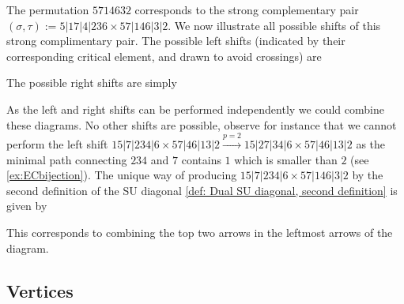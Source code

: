 \begin{example} \label{ex:shifts}
The permutation $5714632$ corresponds to the strong complementary pair $(\sigma,\tau) := 5|17|4|236 \times 57|146|3|2$. We now illustrate all possible shifts of this strong complimentary pair. The possible left shifts (indicated by their corresponding critical element, and drawn to avoid crossings) are
\begin{center}
\end{center}
The possible right shifts are simply
\begin{center}
\end{center}
As the left and right shifts can be performed independently we could combine these diagrams.
No other shifts are possible, observe for instance that we cannot perform the left shift $15|7|234|6 \times 57|46|13|2 \xrightarrow{p=2} 15|27|34|6 \times 57|46|13|2$ as the minimal path connecting $234$ and $7$ contains $1$ which is smaller than $2$ (see \cref{ex:ECbijection}). The unique way of producing $15|7|234|6 \times 57|146|3|2$ by the second definition of the SU diagonal \cref{def: Dual SU diagonal, second definition} is given by
\begin{center}
\end{center}
This corresponds to combining the top two arrows in the leftmost arrows of the diagram.
\end{example}



\subsection{Vertices}

